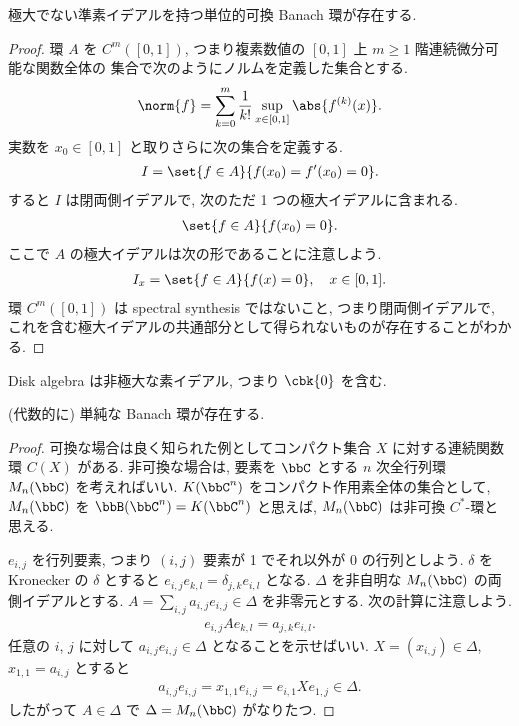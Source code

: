 \documentclass[openany, a4paper, oneside]{jsbook}
\begin{document}
\begin{ex}
極大でない準素イデアルを持つ単位的可換 Banach 環が存在する.
\end{ex}
\begin{proof}
環 $A$ を $C^m ([0, 1])$, つまり複素数値の $[0, 1]$ 上 $m \geq 1$ 階連続微分可能な関数全体の
集合で次のようにノルムを定義した集合とする.
\begin{align}
 \norm{f}
 =
 \sum_{k=0}^m \frac{1}{k!} \sup_{x \in [0, 1]} \abs{f^{(k)} (x)}.
\end{align}
実数を $x_0 \in [0, 1]$ と取りさらに次の集合を定義する.
\begin{align}
 I
 =
 \set{f \in A}{f(x_0) = f'(x_0) = 0}.
\end{align}
すると $I$ は閉両側イデアルで, 次のただ 1 つの極大イデアルに含まれる.
\begin{align}
 \set{f \in A}{f(x_0) = 0}.
\end{align}
ここで $A$ の極大イデアルは次の形であることに注意しよう.
\begin{align}
 I_x
 =
 \set{f \in A}{f(x) = 0}, \quad x \in [0, 1].
\end{align}
環 $C^m ([0, 1])$ は spectral synthesis ではないこと,
つまり閉両側イデアルで, これを含む極大イデアルの共通部分として得られないものが存在することがわかる.
\end{proof}
\begin{rem}
Disk algebra は非極大な素イデアル, つまり $\cbk{0}$ を含む.
\end{rem}

\begin{ex}
(代数的に) 単純な Banach 環が存在する.
\end{ex}
\begin{proof}
可換な場合は良く知られた例としてコンパクト集合 $X$ に対する連続関数環 $C(X)$ がある.
非可換な場合は, 要素を $\bbC$ とする $n$ 次全行列環 $M_n(\bbC)$ を考えればいい.
$K (\bbC^n)$ をコンパクト作用素全体の集合として, $M_n (\bbC)$ を $\bbB (\bbC^n) = K(\bbC^n)$ と思えば,
$M_n (\bbC)$ は非可換 $C^*$-環と思える.

$e_{i,j}$ を行列要素, つまり $(i,j)$ 要素が 1 でそれ以外が 0 の行列としよう.
$\delta$ を Kronecker の $\delta$ とすると $e_{i,j} e_{k,l} = \delta_{j,k} e_{i,l}$ となる.
$\Delta$ を非自明な $M_n(\bbC)$ の両側イデアルとする.
$A = \sum_{i,j} a_{i,j} e_{i,j} \in \Delta$ を非零元とする.
次の計算に注意しよう.
\begin{align}
 e_{i,j} A e_{k,l}
 =
 a_{j,k} e_{i,l}.
\end{align}
任意の $i$, $j$ に対して $a_{i,j} e_{i,j} \in \Delta$ となることを示せばいい.
$X = (x_{i,j}) \in \Delta$, $x_{1,1} = a_{i,j}$ とすると
\begin{align}
 a_{i,j} e_{i,j}
 =
 x_{1,1} e_{i,j}
 =
 e_{i,1} X e_{1,j} \in \Delta.
\end{align}
したがって $A \in \Delta$ で $\Delta = M_n(\bbC)$ がなりたつ.
\end{proof}
\end{document}
